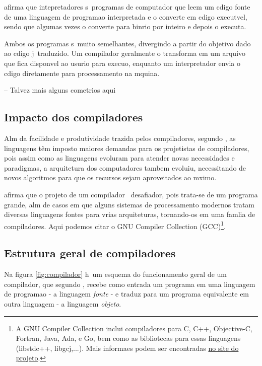 \cite{wiki:interpretadores} afirma que intepretadores s\ao\ programas de computador que leem um c\oh digo fonte de uma linguagem de programa\ca o interpretada e o converte em c\oh digo execut\ah vel, sendo que algumas vezes o converte para bin\ah rio por inteiro e depois o executa.

Ambos os programas s\ao\ muito semelhantes, divergindo a partir do objetivo dado ao c\oh digo j\ah\ traduzido. Um compilador geralmente o transforma em um arquivo que fica dispon\ih vel ao usu\ah rio para execu\ca o, enquanto um interpretador envia o c\oh digo diretamente para processamento na m\ah quina.

-- Talvez mais alguns comet\ah rios aqui

\subsection{Impacto dos compiladores}

Al\eh m da facilidade e produtividade trazida pelos compiladores, segundo \cite{Aho08}, as linguagens t\^em imposto maiores demandas para os projetistas de compiladores, pois assim como as linguagens evolu\ih ram para atender novas necessidades e paradigmas, a arquitetura dos computadores tambem evoluiu, necessitando de novos algoritmos para que os recursos sejam aproveitados ao m\ah ximo.

\cite{Aho08} afirma que o projeto de um compilador \eh\ desafiador, pois trata-se de um programa grande, al\eh m de casos em que alguns sistemas de processamento modernos tratam diversas linguagens fontes para v\ah rias arquiteturas, tornando-os em uma fam\ih lia de compiladores. Aqui podemos citar o GNU Compiler Collection (GCC)\footnote{A GNU Compiler Collection inclui compiladores para C, C++, Objective-C, Fortran, Java, Ada, e Go, bem como as bibliotecas para essas linguagens (libstdc++, libgcj,...). Mais informa\co es podem ser encontradas \href{http://gcc.gnu.org}{no site do projeto}.}.

\subsection{Estrutura geral de compiladores}

Na figura \ref{fig:compilador} h\ah\ um esquema do funcionamento geral de um compilador, que segundo \cite{Aho08}, recebe como entrada um programa em uma linguagem de programa\ca o - a linguagem \emph{fonte} - e traduz para um programa equivalente em outra linguagem - a linguagem \emph{objeto}.

